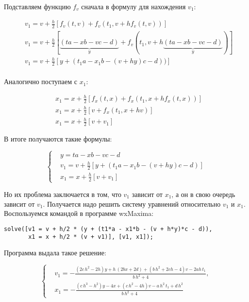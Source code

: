 \documentclass[12pt, a4paper]{article}
\begin{document}
Подставляем функцию $f_v$ сначала в формулу для нахождения $v_1$:

$$\begin{aligned}
&v_1 = v + \frac{h}{2}\left[f_v(t, v) + f_v(t_1, v+h f_v(t, v))\right] \\
&v_1 = v + \frac{h}{2}\left[\underbrace{(t a - x b - v c - d)}_y + f_v(t_1, v+h\underbrace{(t a - x b - v c - d)}_y)\right] \\
&v_1 = v + \frac{h}{2}\left[y + (t_1 a - x_1 b - (v + h y)c - d))\right] \\
\end{aligned}$$

Аналогично поступаем с $x_1$:

$$\begin{aligned}
&x_1 = x + \frac{h}{2}\left[f_x(t, x) + f_x(t_1, x+h f_x(t, x))\right] \\
&x_1 = x + \frac{h}{2}\left[v + f_x(t_1, x+h v)\right] \\
&x_1 = x + \frac{h}{2}\left[v + v_1\right]
\end{aligned}$$

В итоге получаются такие формулы:

$$\left\{\begin{aligned}
&y = t a - x b - v c - d \\
&v_1 = v + \frac{h}{2}\left[y + (t_1 a - x_1 b - (v+h y)c - d)\right] \\
&x_1 = x + \frac{h}{2}\left[v + v_1\right]
\end{aligned}\right.$$

Но их проблема заключается в том, что $v_1$ зависит от $x_1$, а он в свою очередь зависит от $v_1$. Получается надо решить систему уравнений относительно $v_1$ и $x_1$. Воспользуемся командой в программе wxMaxima: 

\begin{verbatim}
solve([v1 = v + h/2 * (y + (t1*a - x1*b - (v + h*y)*c - d)), 
       x1 = x + h/2 * (v + v1)], [v1, x1]);
\end{verbatim}

Программа выдала такое решение:

$$\left\{\begin{aligned}
&\mathit{v_1}=-\frac{\left( 2c\,{{h}^{2}}-2h\right) y+h\,\left( 2bx+2d\right) +\left( b\,{{h}^{2}}+2ch-4\right) v-2ah\,\mathit{t_1}}{b\,{{h}^{2}}+4}, \\
&\mathit{x_1}=-\frac{\left( c\,{{h}^{3}}-{{h}^{2}}\right) y-4x+\left( c\,{{h}^{2}}-4h\right) v-a\,{{h}^{2}}\,\mathit{t_1}+d\,{{h}^{2}}}{b\,{{h}^{2}}+4}
\end{aligned}\right.$$
\end{document}
